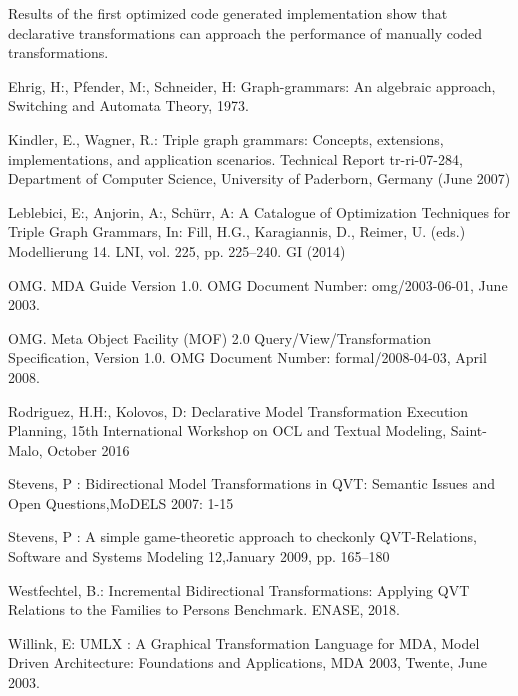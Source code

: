 \documentclass{llncs}
\begin{document}
Results of the first optimized code generated implementation show that declarative transformations can approach the performance of manually coded transformations.  
%
%
\begin{thebibliography}{}
	
Ehrig, H:, Pfender, M:, Schneider, H: Graph-grammars: An algebraic approach, Switching and Automata Theory, 1973. 

Kindler, E., Wagner, R.: Triple graph grammars: Concepts, extensions, implementations, and application scenarios. Technical Report tr-ri-07-284, Department of Computer Science, University of Paderborn, Germany (June 2007)
 
Leblebici, E:, Anjorin, A:, Sch\"urr, A: A Catalogue of Optimization Techniques for Triple Graph Grammars,
In:  Fill,  H.G.,  Karagiannis,  D.,  Reimer,  U.  (eds.)
Modellierung 14. LNI, vol. 225, pp. 225–240. GI (2014)

OMG. MDA Guide Version 1.0.
OMG Document Number: omg/2003-06-01, June 2003.

OMG. Meta Object Facility (MOF) 2.0 Query/View/Transformation Specification, Version 1.0.
OMG Document Number: formal/2008-04-03, April 2008.

Rodriguez, H.H:, Kolovos, D: Declarative Model Transformation Execution Planning,
15th International Workshop on OCL and Textual Modeling, Saint-Malo, October 2016

Stevens, P : Bidirectional Model Transformations in QVT: Semantic Issues and
Open Questions,MoDELS 2007: 1-15

Stevens, P : A simple game-theoretic approach to checkonly QVT-Relations,
Software and Systems Modeling 12,January 2009, pp. 165–180

Westfechtel, B.: Incremental Bidirectional Transformations: Applying QVT Relations to the Families to Persons Benchmark. ENASE, 2018.

Willink, E: UMLX : A Graphical Transformation Language for MDA,
Model Driven Architecture: Foundations and Applications, MDA 2003, Twente, June 2003.



\end{thebibliography}
\end{document}
